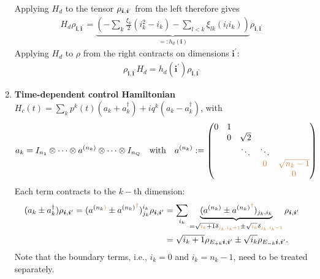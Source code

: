 \documentclass[letterpaper]{article}
\newcommand{\bfi}{\boldsymbol{i}}
\newcommand{\p}{\prime}
\newcommand{\YC}[1]{{\textcolor{Bronze}{#1}}}
\begin{document}
\begin{enumerate}
      Applying $H_d$ to the tensor $\rho_{\bfi, \bfi^\YC{\p}}$ from the left
      therefore gives  
      \begin{align}
        H_d \rho_{\bfi, \bfi^\p} = \underbrace{\left(-\sum_k
        \frac{\xi_k}{2}(i_k^2 - i_k) - \sum_{l<k} \xi_{lk} (i_l i_k)
        \right)}_{=:h_d(\bfi)} \rho_{\bfi, \bfi^\p}
      \end{align}
      Applying $H_d$ to $\rho$ from the right contracts on dimensions
      $\bfi^\prime$:
      \begin{align}\label{eq:HdRight}
        \rho_{\bfi, \bfi^\p} H_d  = h_d(\bfi^\p) \rho_{\bfi,\bfi^\p}
      \end{align}

    \item \textbf{Time-dependent control Hamiltonian} $H_c(t) = \sum_k p^k(t)
      (a_k + a_k^\dag) + iq^k(a_k - a_k^\dag)$, with  
      \begin{align}
      a_k = I_{n_1}\otimes \dots \otimes a^{(n_k)} \otimes \dots \otimes I_{n_Q}
        \quad \text{with} \quad a^{(n_k)} := \begin{pmatrix} 0 & 1 & \\ & 0 &
        \sqrt{2} & \\ & & \ddots & \ddots \\ & & & \YC{0} &
        \YC{\sqrt{n_k-1}} \\ & & & & \YC{0} \end{pmatrix}
      \end{align}
      Each term contracts to the $k-$th dimension:
      \begin{align}
        (a_k\pm a_k^\dag) \rho_{\bfi,\bfi^\p} = (a^{(n_k\YC{)}} \pm
        {a^{(n_k)}}^\YC{\dag})^{i_k}_{j_k} \rho_{\bfi,\bfi^\prime} &= \sum_{i_k}
        \underbrace{(a^{(n_k)} \pm {a^{(n_k)}}^{\YC{\dag}})_{j_k,i_k}}_{=
        \sqrt{\YC{i_k}+1}
        \delta_{\YC{j_k,i_k+1}} \pm \sqrt{\YC{i_k}} \delta_{\YC{j_k,i_k-1}}}
        \rho_{\bfi, \bfi^{\prime}} \\
        &= \sqrt{i_k+1} \rho_{E_{+k}\bfi, \bfi^\prime} \pm \sqrt{i_k}
        \rho_{E_{-k}\bfi, \bfi^\prime}.
      \end{align}
      \YC{Note that the boundary terms, i.e., $i_k = 0$ and $i_k = n_k-1$, need
      to be treated separately.}


\end{enumerate}
\end{document}
